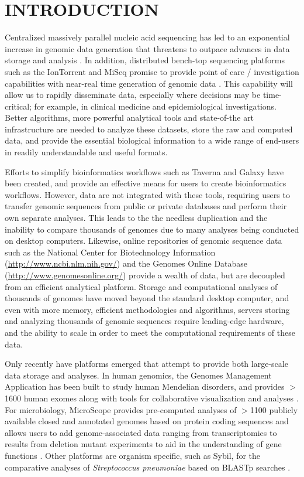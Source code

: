 \documentclass[a4paper,twoside]{article}
\begin{document}
\section{\uppercase{Introduction}}
\label{sec:introduction}

\noindent Centralized massively parallel nucleic acid sequencing has led to an exponential increase in genomic data generation that threatens to outpace advances in data storage and analysis \cite{kahn_future_2011,teeling_current_2012}. In addition, distributed bench-top sequencing platforms such as the IonTorrent and MiSeq promise to provide point of care / investigation capabilities with near-real time generation of genomic data \cite{loman_performance_2012}. This capability will allow us to rapidly disseminate data, especially where decisions may be time-critical; for example, in clinical medicine and epidemiological investigations. Better algorithms, more powerful analytical tools and state-of-the art infrastructure are needed to analyze these datasets, store the raw and computed data, and provide the essential biological information to a wide range of end-users in readily understandable and useful formats.

Efforts to simplify bioinformatics workflows such as Taverna \cite{lanzen_taverna_2008} and Galaxy \cite{goecks_galaxy:_2010} have been created, and provide an effective means for users to create bioinformatics workflows. However, data are not integrated with these tools, requiring users to transfer genomic sequences from public or private databases and perform their own separate analyses. This leads to the the needless duplication and the inability to compare thousands of genomes due to many analyses being conducted on desktop computers. Likewise, online repositories of genomic sequence data such as the National Center for Biotechnology Information (\url{http://www.ncbi.nlm.nih.gov/}) and the Genomes Online Database (\url{http://www.genomesonline.org/}) provide a wealth of data, but are decoupled from an efficient analytical platform. Storage and computational analyses of thousands of genomes have moved beyond the standard desktop computer, and even with more memory, efficient methodologies and algorithms, servers storing and analyzing thousands of genomic sequences require leading-edge hardware, and the ability to scale in order to meet the computational requirements of these data.

Only recently have platforms emerged that attempt to provide both large-scale data storage and analyses. In human genomics, the Genomes Management Application has been built to study human Mendelian disorders, and provides $>$1600 human exomes along with tools for collaborative visualization and analyses \cite{gonzalez_genomes_2013}. For microbiology, MicroScope provides pre-computed analyses of $>$1100 publicly available closed and annotated genomes based on protein coding sequences and allows users to add genome-associated data ranging from transcriptomics to results from deletion mutant experiments to aid in the understanding of gene functions \cite{vallenet_microscope--integrated_2012}. Other platforms are organism specific, such as Sybil, for the comparative analyses of \textit{Streptococcus pneumoniae} based on BLASTp searches \cite{riley_using_2012}.
\end{document}
